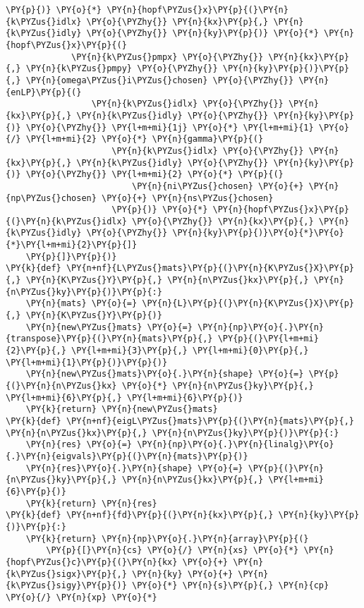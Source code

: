 \begin{Verbatim}[commandchars=\\\{\}]
         \PY{p}{)} \PY{o}{*} \PY{n}{hopf\PYZus{}x}\PY{p}{(}\PY{n}{k\PYZus{}idlx} \PY{o}{\PYZhy{}} \PY{n}{kx}\PY{p}{,} \PY{n}{k\PYZus{}idly} \PY{o}{\PYZhy{}} \PY{n}{ky}\PY{p}{)} \PY{o}{*} \PY{n}{hopf\PYZus{}x}\PY{p}{(}
             \PY{n}{k\PYZus{}pmpx} \PY{o}{\PYZhy{}} \PY{n}{kx}\PY{p}{,} \PY{n}{k\PYZus{}pmpy} \PY{o}{\PYZhy{}} \PY{n}{ky}\PY{p}{)}\PY{p}{,} \PY{n}{omega\PYZus{}i\PYZus{}chosen} \PY{o}{\PYZhy{}} \PY{n}{enLP}\PY{p}{(}
                 \PY{n}{k\PYZus{}idlx} \PY{o}{\PYZhy{}} \PY{n}{kx}\PY{p}{,} \PY{n}{k\PYZus{}idly} \PY{o}{\PYZhy{}} \PY{n}{ky}\PY{p}{)} \PY{o}{\PYZhy{}} \PY{l+m+mi}{1j} \PY{o}{*} \PY{l+m+mi}{1} \PY{o}{/} \PY{l+m+mi}{2} \PY{o}{*} \PY{n}{gamma}\PY{p}{(}
                     \PY{n}{k\PYZus{}idlx} \PY{o}{\PYZhy{}} \PY{n}{kx}\PY{p}{,} \PY{n}{k\PYZus{}idly} \PY{o}{\PYZhy{}} \PY{n}{ky}\PY{p}{)} \PY{o}{\PYZhy{}} \PY{l+m+mi}{2} \PY{o}{*} \PY{p}{(}
                         \PY{n}{ni\PYZus{}chosen} \PY{o}{+} \PY{n}{np\PYZus{}chosen} \PY{o}{+} \PY{n}{ns\PYZus{}chosen}
                     \PY{p}{)} \PY{o}{*} \PY{n}{hopf\PYZus{}x}\PY{p}{(}\PY{n}{k\PYZus{}idlx} \PY{o}{\PYZhy{}} \PY{n}{kx}\PY{p}{,} \PY{n}{k\PYZus{}idly} \PY{o}{\PYZhy{}} \PY{n}{ky}\PY{p}{)}\PY{o}{*}\PY{o}{*}\PY{l+m+mi}{2}\PY{p}{]}
    \PY{p}{]}\PY{p}{)}
\PY{k}{def} \PY{n+nf}{L\PYZus{}mats}\PY{p}{(}\PY{n}{K\PYZus{}X}\PY{p}{,} \PY{n}{K\PYZus{}Y}\PY{p}{,} \PY{n}{n\PYZus{}kx}\PY{p}{,} \PY{n}{n\PYZus{}ky}\PY{p}{)}\PY{p}{:}
    \PY{n}{mats} \PY{o}{=} \PY{n}{L}\PY{p}{(}\PY{n}{K\PYZus{}X}\PY{p}{,} \PY{n}{K\PYZus{}Y}\PY{p}{)}
    \PY{n}{new\PYZus{}mats} \PY{o}{=} \PY{n}{np}\PY{o}{.}\PY{n}{transpose}\PY{p}{(}\PY{n}{mats}\PY{p}{,} \PY{p}{(}\PY{l+m+mi}{2}\PY{p}{,} \PY{l+m+mi}{3}\PY{p}{,} \PY{l+m+mi}{0}\PY{p}{,} \PY{l+m+mi}{1}\PY{p}{)}\PY{p}{)}
    \PY{n}{new\PYZus{}mats}\PY{o}{.}\PY{n}{shape} \PY{o}{=} \PY{p}{(}\PY{n}{n\PYZus{}kx} \PY{o}{*} \PY{n}{n\PYZus{}ky}\PY{p}{,} \PY{l+m+mi}{6}\PY{p}{,} \PY{l+m+mi}{6}\PY{p}{)}
    \PY{k}{return} \PY{n}{new\PYZus{}mats}
\PY{k}{def} \PY{n+nf}{eigL\PYZus{}mats}\PY{p}{(}\PY{n}{mats}\PY{p}{,} \PY{n}{n\PYZus{}kx}\PY{p}{,} \PY{n}{n\PYZus{}ky}\PY{p}{)}\PY{p}{:}
    \PY{n}{res} \PY{o}{=} \PY{n}{np}\PY{o}{.}\PY{n}{linalg}\PY{o}{.}\PY{n}{eigvals}\PY{p}{(}\PY{n}{mats}\PY{p}{)}
    \PY{n}{res}\PY{o}{.}\PY{n}{shape} \PY{o}{=} \PY{p}{(}\PY{n}{n\PYZus{}ky}\PY{p}{,} \PY{n}{n\PYZus{}kx}\PY{p}{,} \PY{l+m+mi}{6}\PY{p}{)}
    \PY{k}{return} \PY{n}{res}
\PY{k}{def} \PY{n+nf}{fd}\PY{p}{(}\PY{n}{kx}\PY{p}{,} \PY{n}{ky}\PY{p}{)}\PY{p}{:}
    \PY{k}{return} \PY{n}{np}\PY{o}{.}\PY{n}{array}\PY{p}{(}
        \PY{p}{[}\PY{n}{cs} \PY{o}{/} \PY{n}{xs} \PY{o}{*} \PY{n}{hopf\PYZus{}c}\PY{p}{(}\PY{n}{kx} \PY{o}{+} \PY{n}{k\PYZus{}sigx}\PY{p}{,} \PY{n}{ky} \PY{o}{+} \PY{n}{k\PYZus{}sigy}\PY{p}{)} \PY{o}{*} \PY{n}{s}\PY{p}{,} \PY{n}{cp} \PY{o}{/} \PY{n}{xp} \PY{o}{*}

\end{Verbatim}
